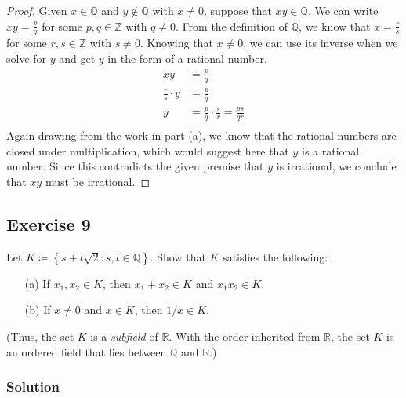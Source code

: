 \documentclass[12pt]{article}
\begin{document}
\begin{itemize}
\begin{proof}
Given $x \in \mathbb{Q}$ and $y \notin \mathbb{Q}$ with $x \neq 0$, suppose that $xy \in \mathbb{Q}$. We can write $xy = \frac{p}{q}$ for some $p, q \in \mathbb{Z}$ with $q \neq 0$. From the definition of $\mathbb{Q}$, we know that $x = \frac{r}{s}$ for some $r, s \in \mathbb{Z}$ with $s \neq 0$. Knowing that $x \neq 0$, we can use its inverse when we solve for $y$ and get $y$ in the form of a rational number.
\begin{align*}
xy &= \frac{p}{q} \\
\frac{r}{s} \cdot y &= \frac{p}{q} \\
y &= \frac{p}{q} \cdot \frac{s}{r} = \frac{ps}{qr} \\
\end{align*}
Again drawing from the work in part (a), we know that the rational numbers are closed under multiplication, which would suggest here that $y$ is a rational number. Since this contradicts the given premise that $y$ is irrational, we conclude that $xy$ must be irrational.
\end{proof}
\end{itemize}

\subsection*{Exercise 9}
Let $K \coloneqq \left\{s + t\sqrt{2} : s, t \in \mathbb{Q}\right\}$. Show that $K$ satisfies the following:
\begin{itemize}
\item[(a)] If $x_1, x_2 \in K$, then $x_1 + x_2 \in K$ and $x_1x_2 \in K$.
\item[(b)] If $x \neq 0$ and $x \in K$, then $1/x \in K$.
\end{itemize}
(Thus, the set $K$ is a {\it subfield} of $\mathbb{R}$. With the order inherited from $\mathbb{R}$, the set $K$ is an ordered field that lies between $\mathbb{Q}$ and $\mathbb{R}$.)
\subsubsection*{Solution}
\end{document}
